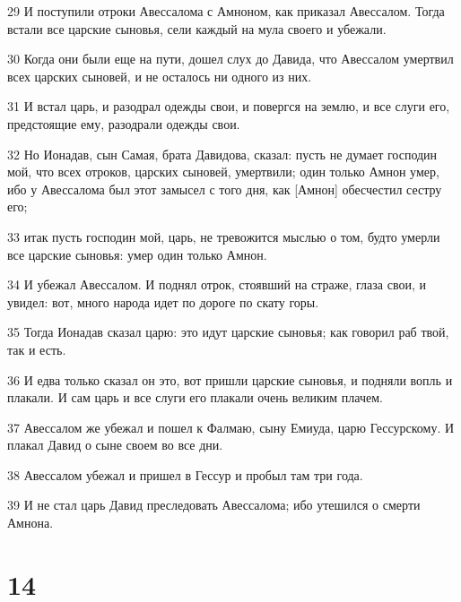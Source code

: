 \par 29 И поступили отроки Авессалома с Амноном, как приказал Авессалом. Тогда встали все царские сыновья, сели каждый на мула своего и убежали.
\par 30 Когда они были еще на пути, дошел слух до Давида, что Авессалом умертвил всех царских сыновей, и не осталось ни одного из них.
\par 31 И встал царь, и разодрал одежды свои, и повергся на землю, и все слуги его, предстоящие ему, разодрали одежды свои.
\par 32 Но Ионадав, сын Самая, брата Давидова, сказал: пусть не думает господин мой, что всех отроков, царских сыновей, умертвили; один только Амнон умер, ибо у Авессалома был этот замысел с того дня, как [Амнон] обесчестил сестру его;
\par 33 итак пусть господин мой, царь, не тревожится мыслью о том, будто умерли все царские сыновья: умер один только Амнон.
\par 34 И убежал Авессалом. И поднял отрок, стоявший на страже, глаза свои, и увидел: вот, много народа идет по дороге по скату горы.
\par 35 Тогда Ионадав сказал царю: это идут царские сыновья; как говорил раб твой, так и есть.
\par 36 И едва только сказал он это, вот пришли царские сыновья, и подняли вопль и плакали. И сам царь и все слуги его плакали очень великим плачем.
\par 37 Авессалом же убежал и пошел к Фалмаю, сыну Емиуда, царю Гессурскому. И плакал Давид о сыне своем во все дни.
\par 38 Авессалом убежал и пришел в Гессур и пробыл там три года.
\par 39 И не стал царь Давид преследовать Авессалома; ибо утешился о смерти Амнона.

\chapter{14}


